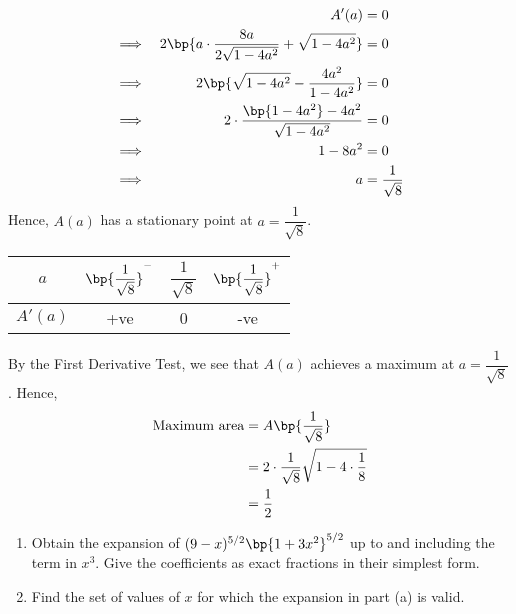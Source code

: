 \documentclass{echw}
\begin{document}
        \begin{alignat*}{2}
            &&A'(a) &= 0\\
            \implies&&2\bp{a \cdot \dfrac{8a}{2\sqrt{1-4a^2}} + \sqrt{1 - 4a^2}} &= 0\\
            \implies&&2\bp{\sqrt{1 - 4a^2} - \dfrac{4a^2}{1-4a^2}} &= 0\\
            \implies&&2 \cdot \dfrac{\bp{1-4a^2} - 4a^2}{\sqrt{1-4a^2}} &= 0\\
            \implies&&1 - 8a^2 &= 0\\
            \implies&&a &= \dfrac1{\sqrt8}
        \end{alignat*}
        Hence, $A(a)$ has a stationary point at $a = \dfrac1{\sqrt8}$.
        \begin{table}[H]
            \centering
            \begin{tabular}{|c|c|c|c|}
            \hline
            $a$ & $\bp{\dfrac1{\sqrt8}}^-$ & $\dfrac1{\sqrt8}$ & $\bp{\dfrac1{\sqrt8}}^+$ \\\hline
            $A'(a)$ & +ve   & 0 & -ve   \\\hline
            \end{tabular}
        \end{table}
         By the First Derivative Test, we see that $A(a)$ achieves a maximum at $a = \dfrac1{\sqrt8}$. Hence,
        \begin{align*}
            \text{Maximum area} &= A\bp{\dfrac1{\sqrt8}}\\
            &= 2\cdot\dfrac1{\sqrt8}\sqrt{1 - 4\cdot\dfrac18}\\
            &= \dfrac12 
        \end{align*}


    \problem{}
        \begin{enumerate}
            \item Obtain the expansion of $(9 - x)^{5/2}\bp{1 + 3x^2}^{5/2}$ up to and including the term in $x^3$. Give the coefficients as exact fractions in their simplest form.
            \item Find the set of values of $x$ for which the expansion in part (a) is valid.
        \end{enumerate}

    \solution
\end{document}
